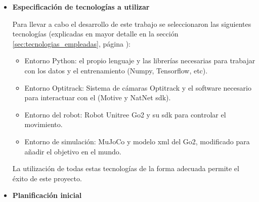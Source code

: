 \begin{itemize}
\begin{longtable}
    \end{longtable}
    \normalsize

    En resumen, de los riesgos recogidos en la tabla anterior, los más destacables debido a su impacto y probabilidad son:

    \begin{itemize}
        \item R1, R3 y R10, principalmente por su capacidad de retrasar fases completas del proyecto o incluso imposibilitar su finalización.
        \item R2 y R5, debido a que repercuten directamente sobre el entrenamiento del sistema.
    \end{itemize}

    Con el fin de paliar y controlar los posibles problemas que pudieran surgir durante el desarrollo se empleó un seguimiento iterativo: al 
    finalizar cada fase se revisaron los riesgos ocurridos, se adoptaron las medidas de mitigación planteadas y de ser necesario se modificó el 
    alcance y la planificación de ciertas fases para adaptarse a estos inconvenientes.

    \item \textbf{Especificación de tecnologías a utilizar}

    Para llevar a cabo el desarrollo de este trabajo se seleccionaron las siguientes tecnologías (explicadas en mayor detalle 
    en la sección \ref{sec:tecnologias_empleadas}, página \pageref{sec:tecnologias_empleadas}):
    
    \begin{itemize}
        \item Entorno Python: el propio lenguaje y las librerías necesarias para trabajar con los datos y el entrenamiento (Numpy, Tensorflow, etc).
        \item Entorno Optitrack: Sistema de cámaras Optitrack y el software necesario para interactuar con el (Motive y NatNet \Gls{sdk}).
        \item Entorno del robot: Robot Unitree Go2 y su \Gls{sdk} para controlar el movimiento.
        \item Entorno de simulación: MuJoCo y modelo \Gls{xml} del Go2, modificado para añadir el objetivo en el mundo.
    \end{itemize}

    La utilización de todas estas tecnologías de la forma adecuada permite el éxito de este proyecto.

    \item \textbf{Planificación inicial}


\end{itemize}
